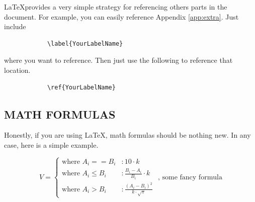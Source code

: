 \documentclass[main.tex]{subfiles}
\begin{document}
        \LaTeX provides a very simple strategy for referencing others parts
        in the document.  For example, you can easily reference Appendix \ref{app:extra}.  
        Just include 
        \begin{verbatim}
            \label{YourLabelName}
        \end{verbatim}
        where you want to reference. Then just use the following to reference that
        location.
        \begin{verbatim}
            \ref{YourLabelName}
        \end{verbatim}
        
    \subsection{MATH FORMULAS}
        Honestly, if you are using \LaTeX, math formulas should be nothing
        new.  In any case, here is a simple example.
        
        \begin{displaymath}
           V = \left\{
             \begin{array}{lr}
               \text{where } A_i ==  B_i  & :  10 \cdot k \\
               \text{where } A_i \leq B_i & : \frac{B_i - A_i}{B_i}\cdot k \\
               \text{where } A_i > B_i  & : \frac{(A_i - B_i)^2 }{k \cdot \sqrt{\pi}}
             \end{array}
           \right. \text{   , some fancy formula}
        \end{displaymath}
        
\end{document}
